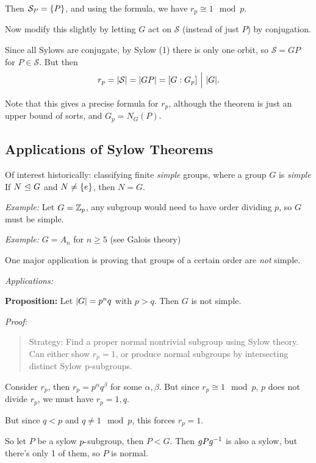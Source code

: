 Then \(\mathcal{S}_P = \left\{{P}\right\}\), and using the formula, we have
\(r_p \cong 1 \mod p\).

Now modify this slightly by letting \(G\) act on \(\mathcal S\) (instead
of just \(P\)) by conjugation.

Since all Sylows are conjugate, by Sylow (1) there is only one orbit, so
\(\mathcal S = GP\) for \(P \in \mathcal S\). But then \[
r_p = {\left\lvert {\mathcal S} \right\rvert} = {\left\lvert {GP} \right\rvert} = [G: G_p] {~\Bigm| ~} {\left\lvert {G} \right\rvert}.
\]

Note that this gives a precise formula for \(r_p\), although the theorem
is just an upper bound of sorts, and \(G_p = N_G(P)\).

\hypertarget{applications-of-sylow-theorems}{%
\subsection{Applications of Sylow
Theorems}\label{applications-of-sylow-theorems}}

Of interest historically: classifying finite \emph{simple} groups, where
a group \(G\) is \emph{simple} If \(N {~\trianglelefteq~} G\) and
\(N \neq \left\{{e}\right\}\), then \(N=G\).

\emph{Example:} Let \(G = {\mathbb{Z}}_p\), any subgroup would need to have order
dividing \(p\), so \(G\) must be simple.

\emph{Example:} \(G = A_n\) for \(n\geq 5\) (see Galois theory)

One major application is proving that groups of a certain order are
\emph{not} simple.

\emph{Applications:}

\textbf{Proposition:} Let \({\left\lvert {G} \right\rvert} = p^n q\) with \(p > q\). Then \(G\)
is not simple.

\emph{Proof:}

\begin{quote}
Strategy: Find a proper normal nontrivial subgroup using Sylow theory.
Can either show \(r_p = 1\), or produce normal subgroups by intersecting
distinct Sylow p-subgroups.
\end{quote}

Consider \(r_p\), then \(r_p = p^\alpha q^\beta\) for some
\(\alpha, \beta\). But since \(r_p \cong 1 \mod p\), \(p\) does not
divide \(r_p\), we must have \(r_p = 1, q\).

But since \(q < p\) and \(q\neq 1 \mod p\), this forces \(r_p = 1\).

So let \(P\) be a sylow \(p{\hbox{-}}\)subgroup, then \(P < G\). Then
\(gPg^{-1}\) is also a sylow, but there's only 1 of them, so \(P\) is
normal.

